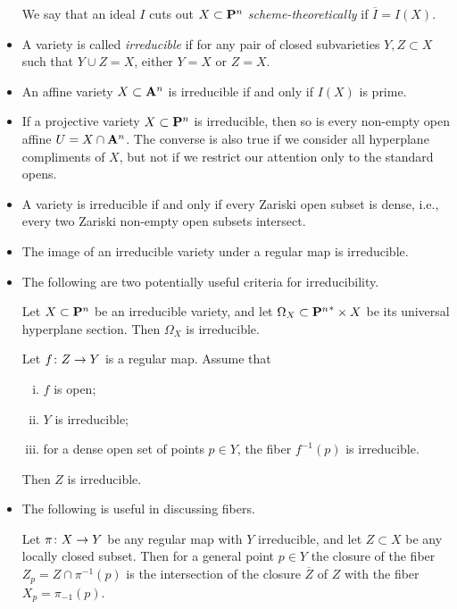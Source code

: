 \begin{itemize}
  We say that an ideal $I$ cuts out $X \subset \P^n$ \emph{scheme-theoretically} if $\overline{I} = I(X)$.

\item
  A variety is called \emph{irreducible} if for any pair of closed subvarieties $Y, Z \subset X$ such that $Y \cup Z = X$, either $Y = X$ or $Z = X$.

\item
  An affine variety $X \subset \A^n$ is irreducible if and only if $I(X)$ is prime.

\item
  If a projective variety $X \subset \P^n$ is irreducible, then so is every non-empty open affine $U = X \cap \A^n$. The converse is also true if we consider all hyperplane compliments of $X$, but not if we restrict our attention only to the standard opens.

\item
  A variety is irreducible if and only if every Zariski open subset is dense, i.e., every two Zariski non-empty open subsets intersect.

\item
  The image of an irreducible variety under a regular map is irreducible.

\item
  The following are two potentially useful criteria for irreducibility.

  \begin{theorem}
    Let $X \subset \P^n$ be an irreducible variety, and let $\Omega_X \subset {\P^n}^\ast \x X$ be its universal hyperplane section. Then $\Omega_X$ is irreducible.
  \end{theorem}

  \begin{theorem}
    Let $f \cn Z \rarr Y$ is a regular map. Assume that
    \begin{enumerate}[(i)]
    \item $f$ is open;
    \item $Y$ is irreducible;
    \item for a dense open set of points $p \in Y$, the fiber $f^{-1}(p)$ is irreducible.
    \end{enumerate}
    Then $Z$ is irreducible.
  \end{theorem}

\item
  The following is useful in discussing fibers.

  \begin{proposition}
    Let $\pi \cn X \rarr Y$ be any regular map with $Y$ irreducible, and let $Z \subset X$ be any locally closed subset. Then for a general point $p \in Y$ the closure of the fiber $Z_p = Z \cap \pi^{-1}(p)$ is the intersection of the closure $\overline{Z}$ of $Z$ with the fiber $X_p = \pi_{-1}(p)$.
  \end{proposition}
\end{itemize}

